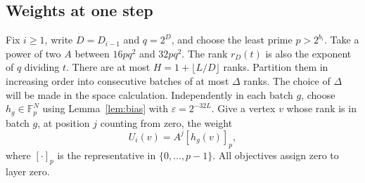\documentclass[11pt]{article}
\newcommand{\F}{\mathbb F}
\begin{document}
\subsection{Weights at one step}

Fix $i\ge1$, write $D=D_{i-1}$ and $q=2^D$, and choose the least prime
$p>2^{b_i}$. Take a power of two $A$ between $16p q^2$ and $32p q^2$.
The rank $r_D(t)$ is also the exponent of $q$ dividing $t$.
There are at most $H=1+\lfloor L/D\rfloor$ ranks.
Partition them in increasing order into consecutive batches of at most
$\Delta$ ranks. The choice of $\Delta$ will be made in the space calculation.
Independently in each batch $g$, choose $h_g\in\F_p^N$ using
Lemma~\ref{lem:bias} with $\varepsilon=2^{-32L}$. Give a vertex $v$
whose rank is in batch $g$, at position $j$ counting from zero, the weight
\[
                    U_i(v)=A^j[h_g(v)]_p,
\]
where $[\cdot]_p$ is the representative in $\{0,\ldots,p-1\}$.
All objectives assign zero to layer zero.
\end{document}
